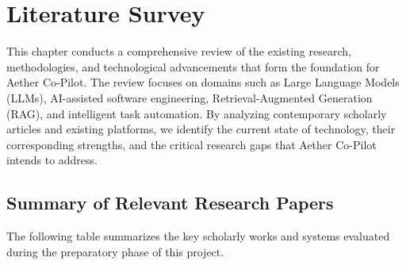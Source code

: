 \chapter{Literature Survey}

This chapter conducts a comprehensive review of the existing research, methodologies, and technological advancements that form the foundation for Aether Co-Pilot. The review focuses on domains such as Large Language Models (LLMs), AI-assisted software engineering, Retrieval-Augmented Generation (RAG), and intelligent task automation. By analyzing contemporary scholarly articles and existing platforms, we identify the current state of technology, their corresponding strengths, and the critical research gaps that Aether Co-Pilot intends to address.

\section{Summary of Relevant Research Papers}

The following table summarizes the key scholarly works and systems evaluated during the preparatory phase of this project.

